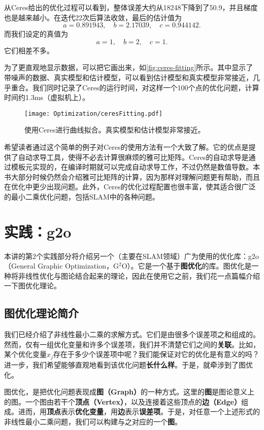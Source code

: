 从Ceres给出的优化过程可以看到，整体误差大约从18248下降到了50.9，并且梯度也是越来越小。在迭代22次后算法收敛，最后的估计值为
\[
a=0.891943,\quad b=2.17039,\quad c=0.944142.
\]
而我们设定的真值为
\[
a=1,\quad b=2,\quad c=1.
\]
它们相差不多。

为了更直观地显示数据，可以把它画出来，如\autoref{fig:ceres-fitting}所示。其中显示了带噪声的数据、真实模型和估计模型，可以看到估计模型和真实模型非常接近，几乎重合。我们同时记录了Ceres的运行时间，对这样一个100个点的优化问题，计算时间约1.3ms（虚拟机上）。

\begin{figure}[!ht]
	\centering
	\texttt{[image: Optimization/ceresFitting.pdf]}
	\caption{使用Ceres进行曲线拟合。真实模型和估计模型非常接近。}
	\label{fig:ceres-fitting}
\end{figure}

希望读者通过这个简单的例子对Ceres的使用方法有一个大致了解。它的优点是提供了自动求导工具，使得不必去计算很麻烦的雅可比矩阵。Ceres的自动求导是通过模板元实现的，在编译时期就可以完成自动求导工作，不过仍然是数值导数。本书大部分时候仍然会介绍雅可比矩阵的计算，因为那样对理解问题更有帮助，而且在优化中更少出现问题。此外，Ceres的优化过程配置也很丰富，使其适合很广泛的最小二乘优化问题，包括SLAM中的各种问题。

\section{实践：g2o}
本讲的第2个实践部分将介绍另一个（主要在SLAM领域）广为使用的优化库：g2o（General Graphic Optimization，G$^2$O）。它是一个基于\textbf{图优化}的库。图优化是一种将非线性优化与图论结合起来的理论，因此在使用它之前，我们花一点篇幅介绍一下图优化理论。

\subsection{图优化理论简介}
我们已经介绍了非线性最小二乘的求解方式。它们是由很多个误差项之和组成的。然而，仅有一组优化变量和许多个误差项，我们并不清楚它们之间的\textbf{关联}。比如，某个优化变量$x_j$存在于多少个误差项中呢？我们能保证对它的优化是有意义的吗？进一步，我们希望能够直观地看到该优化问题\textbf{长什么样}。于是，就牵涉到了图优化。

图优化，是把优化问题表现成\textbf{图（Graph）}的一种方式。这里的\textbf{图}是图论意义上的图。一个图由若干个\textbf{顶点（Vertex）}，以及连接着这些顶点的\textbf{边（Edge）}组成。进而，用\textbf{顶点}表示\textbf{优化变量}，用\textbf{边}表示\textbf{误差项}。于是，对任意一个上述形式的非线性最小二乘问题，我们可以构建与之对应的一个\textbf{图}。

